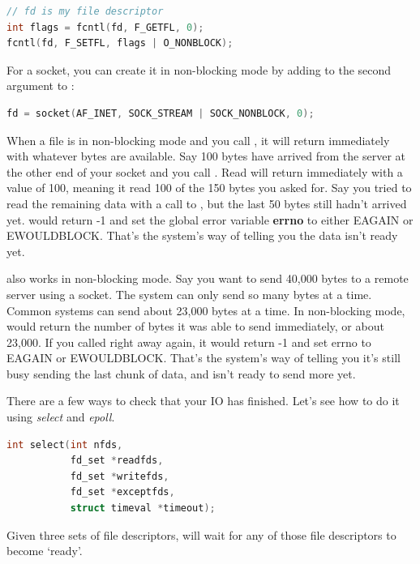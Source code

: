 \begin{lstlisting}[language=C]
// fd is my file descriptor
int flags = fcntl(fd, F_GETFL, 0);
fcntl(fd, F_SETFL, flags | O_NONBLOCK);
\end{lstlisting}

For a socket, you can create it in non-blocking mode by adding  to the second argument to :

\begin{lstlisting}[language=C]
fd = socket(AF_INET, SOCK_STREAM | SOCK_NONBLOCK, 0);
\end{lstlisting}

When a file is in non-blocking mode and you call , it will return immediately with whatever bytes are available.
Say 100 bytes have arrived from the server at the other end of your socket and you call .
Read will return immediately with a value of 100, meaning it read 100 of the 150 bytes you asked for.
Say you tried to read the remaining data with a call to , but the last 50 bytes still hadn't arrived yet.
 would return -1 and set the global error variable \textbf{errno} to either EAGAIN or EWOULDBLOCK.
That's the system's way of telling you the data isn't ready yet.

 also works in non-blocking mode.
Say you want to send 40,000 bytes to a remote server using a socket.
The system can only send so many bytes at a time.
Common systems can send about 23,000 bytes at a time.
In non-blocking mode,  would return the number of bytes it was able to send immediately, or about 23,000.
If you called  right away again, it would return -1 and set errno to EAGAIN or EWOULDBLOCK.
That's the system's way of telling you it's still busy sending the last chunk of data, and isn't ready to send more yet.

There are a few ways to check that your IO has finished.
Let's see how to do it using \emph{select} and \emph{epoll}.

\begin{lstlisting}[language=C]
int select(int nfds,
           fd_set *readfds,
           fd_set *writefds,
           fd_set *exceptfds,
           struct timeval *timeout);
\end{lstlisting}

Given three sets of file descriptors,  will wait for any of those file descriptors to become `ready'.


